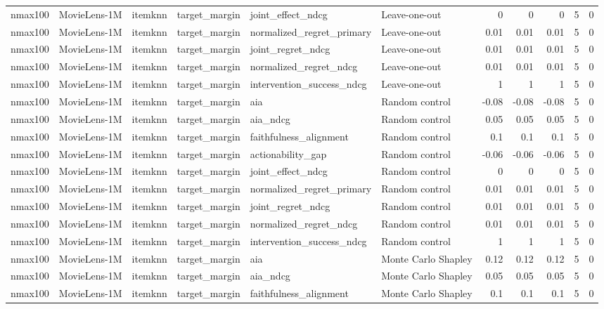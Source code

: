 \begin{table}[t]
{\begin{tabular}{llllllrrrrr}
nmax100 & MovieLens-1M & itemknn & target\_margin & joint\_effect\_ndcg & Leave-one-out & 0 & 0 & 0 & 5 & 0 \\
nmax100 & MovieLens-1M & itemknn & target\_margin & normalized\_regret\_primary & Leave-one-out & 0.01 & 0.01 & 0.01 & 5 & 0 \\
nmax100 & MovieLens-1M & itemknn & target\_margin & joint\_regret\_ndcg & Leave-one-out & 0.01 & 0.01 & 0.01 & 5 & 0 \\
nmax100 & MovieLens-1M & itemknn & target\_margin & normalized\_regret\_ndcg & Leave-one-out & 0.01 & 0.01 & 0.01 & 5 & 0 \\
nmax100 & MovieLens-1M & itemknn & target\_margin & intervention\_success\_ndcg & Leave-one-out & 1 & 1 & 1 & 5 & 0 \\
nmax100 & MovieLens-1M & itemknn & target\_margin & aia & Random control & -0.08 & -0.08 & -0.08 & 5 & 0 \\
nmax100 & MovieLens-1M & itemknn & target\_margin & aia\_ndcg & Random control & 0.05 & 0.05 & 0.05 & 5 & 0 \\
nmax100 & MovieLens-1M & itemknn & target\_margin & faithfulness\_alignment & Random control & 0.1 & 0.1 & 0.1 & 5 & 0 \\
nmax100 & MovieLens-1M & itemknn & target\_margin & actionability\_gap & Random control & -0.06 & -0.06 & -0.06 & 5 & 0 \\
nmax100 & MovieLens-1M & itemknn & target\_margin & joint\_effect\_ndcg & Random control & 0 & 0 & 0 & 5 & 0 \\
nmax100 & MovieLens-1M & itemknn & target\_margin & normalized\_regret\_primary & Random control & 0.01 & 0.01 & 0.01 & 5 & 0 \\
nmax100 & MovieLens-1M & itemknn & target\_margin & joint\_regret\_ndcg & Random control & 0.01 & 0.01 & 0.01 & 5 & 0 \\
nmax100 & MovieLens-1M & itemknn & target\_margin & normalized\_regret\_ndcg & Random control & 0.01 & 0.01 & 0.01 & 5 & 0 \\
nmax100 & MovieLens-1M & itemknn & target\_margin & intervention\_success\_ndcg & Random control & 1 & 1 & 1 & 5 & 0 \\
nmax100 & MovieLens-1M & itemknn & target\_margin & aia & Monte Carlo Shapley & 0.12 & 0.12 & 0.12 & 5 & 0 \\
nmax100 & MovieLens-1M & itemknn & target\_margin & aia\_ndcg & Monte Carlo Shapley & 0.05 & 0.05 & 0.05 & 5 & 0 \\
nmax100 & MovieLens-1M & itemknn & target\_margin & faithfulness\_alignment & Monte Carlo Shapley & 0.1 & 0.1 & 0.1 & 5 & 0 \\

\end{tabular}}
\end{table}
